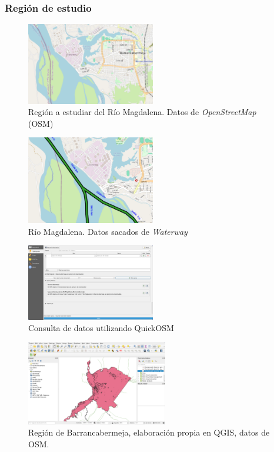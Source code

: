 \documentclass[17pt, t, lualatex]{beamer}
\begin{document}
\begin{frame}[allowframebreaks]
  \frametitle{Región de estudio}
  
  \begin{figure}[ht]
    \centering
    \includegraphics[width=0.5\textwidth]{img/OSM-1.png}
    \caption{Región a estudiar del Río Magdalena. Datos de \textit{OpenStreetMap} (OSM)\cite{openstreetmap_magdalena2025}}
  \end{figure}

  \begin{figure}[ht]
    \centering
    \includegraphics[width=0.5\textwidth]{img/Waterway.png}
    \caption{Río Magdalena. Datos sacados de \textit{Waterway}\cite{waterwaymap2025}}
  \end{figure}

  \begin{figure}[ht]
    \centering
    \includegraphics[width=0.5\textwidth]{img/QGIS-5.png}
    \caption{Consulta de datos utilizando QuickOSM\cite{quickosm2025}}
  \end{figure}


  \begin{figure}[ht]
    \centering
    \includegraphics[width=0.55\textwidth]{img/QGIS-1.png}
    \caption{Región de Barrancabermeja, elaboración propia en QGIS\cite{qgis2025}, datos de OSM\cite{openstreetmap_magdalena2025}.}
  \end{figure}



\end{frame}
\end{document}
